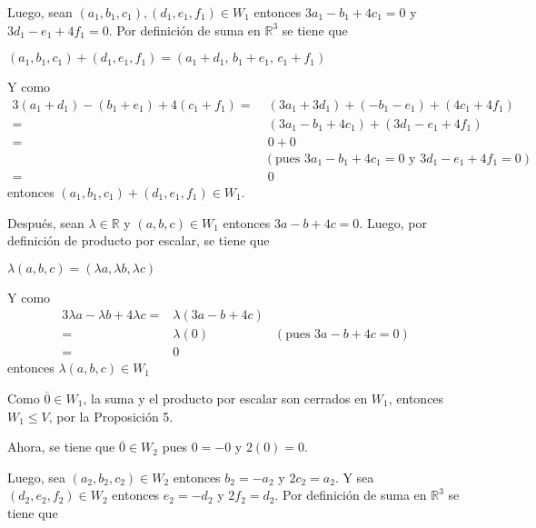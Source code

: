 \documentclass[fleqn]{article}
\begin{document}
\begin{enumerate}
\begin{enumerate}
            Luego, sean $ (a_1,b_1,c_1), (d_1,e_1,f_1) \in W_1 $ entonces $ 3a_1 - b_1 + 4c_1 = 0 $ y $ 3d_1 - e_1 + 4f_1 = 0 $. Por definición de suma en $ \mathbb{R}^3 $ se tiene que \par

            $ (a_1,b_1,c_1) + (d_1,e_1,f_1) = (a_1+d_1, \, b_1+e_1, \, c_1+f_1) $ \par

            Y como
            \begin{align*}
                3(a_1+d_1) - (b_1+e_1) + 4(c_1+f_1) =& \; (3a_1 + 3d_1) + (- b_1 - e_1) + (4c_1 + 4f_1) \\
                =& \; (3a_1 - b_1 + 4c_1) + (3d_1 - e_1 + 4f_1) \\
                =& \; 0 + 0 \\
                & (\text{pues } 3a_1 - b_1 + 4c_1 = 0 \text{ y } 3d_1 - e_1 + 4f_1 = 0) \\
                =& \; 0
            \end{align*}
            entonces $ (a_1,b_1,c_1) + (d_1,e_1,f_1) \in W_1 $.

            Después, sean $ \lambda \in \mathbb{R} $ y $ (a,b,c) \in W_1 $ entonces $ 3a - b + 4c = 0 $. Luego, por definición de producto por escalar, se tiene que \par

            $ \lambda (a,b,c) = (\lambda a, \lambda b, \lambda c) $ \par

            Y como
            \begin{align*}
                3\lambda a - \lambda b + 4 \lambda c =& \lambda (3a - b + 4c) \\
                =& \lambda (0) &(\text{pues } 3a - b + 4c = 0) \\
                =& 0
            \end{align*}
            entonces $ \lambda (a,b,c) \in W_1 $ \par

            Como $ \overline{0} \in W_1 $, la suma y el producto por escalar son cerrados en $ W_1 $, entonces $ W_1 \leq V $, por la Proposición 5.
            
            Ahora, se tiene que $ \overline{0} \in W_2 $ pues $ 0 = -0 $ y $ 2(0) = 0 $.

            Luego, sea $ (a_2,b_2,c_2) \in W_2 $ entonces $ b_2 = -a_2 $ y $ 2c_2 = a_2 $. Y sea $ (d_2,e_2,f_2) \in W_2 $ entonces $ e_2 = -d_2 $ y $ 2f_2 = d_2 $. Por definición de suma en $ \mathbb{R}^3 $ se tiene que \par


\end{enumerate}
\end{enumerate}
\end{document}
